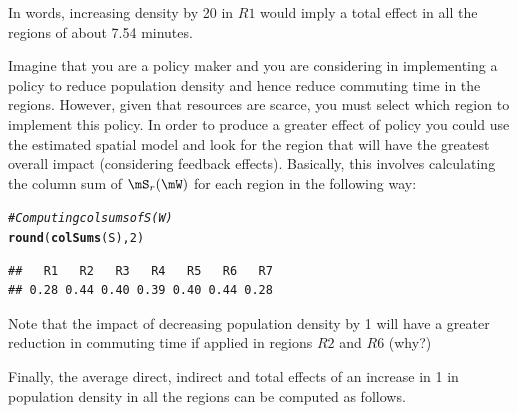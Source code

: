 \documentclass[english,12pt]{book}\usepackage[]{graphicx}\usepackage[]{xcolor}
\makeatletter
\newcommand{\hlnum}[1]{\textcolor[rgb]{0.686,0.059,0.569}{#1}}%
\newcommand{\hlcom}[1]{\textcolor[rgb]{0.678,0.584,0.686}{\textit{#1}}}%
\newcommand{\hldef}[1]{\textcolor[rgb]{0.345,0.345,0.345}{#1}}%
\newcommand{\hlkwd}[1]{\textcolor[rgb]{0.737,0.353,0.396}{\textbf{#1}}}%
\newenvironment{kframe}{%
 \def\at@end@of@kframe{}%
 \ifinner\ifhmode%
  \def\at@end@of@kframe{\end{minipage}}%
  \begin{minipage}{\columnwidth}%
 \fi\fi%
 \def\FrameCommand##1{\hskip\@totalleftmargin \hskip-\fboxsep
 \colorbox{shadecolor}{##1}\hskip-\fboxsep
     \hskip-\linewidth \hskip-\@totalleftmargin \hskip\columnwidth}%
 \MakeFramed {\advance\hsize-\width
   \@totalleftmargin\z@ \linewidth\hsize
   \@setminipage}}%
 {\par\unskip\endMakeFramed%
 \at@end@of@kframe}
\newenvironment{knitrout}{}{} %
\makeatother
\begin{document}
In words, increasing density by 20 in $R1$ would imply a total effect  in all the regions of about 7.54 minutes.

Imagine that you are a policy maker and you are considering in implementing a policy to reduce population density and hence reduce commuting time in the regions. However, given that resources are scarce, you must select which region to implement this policy. In order to produce a greater effect of policy you could use the estimated spatial model and look for the region that will have the greatest overall impact (considering feedback effects). Basically, this involves calculating the column sum of $\mS_r(\mW)$ for each region in the following way: 

\begin{knitrout}
\color{fgcolor}\begin{kframe}
\begin{alltt}
\hlcom{# Computing colsums of S(W)}
\hlkwd{round}\hldef{(}\hlkwd{colSums}\hldef{(S),} \hlnum{2}\hldef{)}
\end{alltt}
\begin{verbatim}
##   R1   R2   R3   R4   R5   R6   R7 
## 0.28 0.44 0.40 0.39 0.40 0.44 0.28
\end{verbatim}
\end{kframe}
\end{knitrout}
   
Note that the impact of decreasing population density by 1 will have a greater reduction in commuting time if applied in regions $R2$ and $R6$ (why?)

Finally, the average direct, indirect and total effects of an increase in 1 in population density in all the regions can be computed as follows. 
\end{document}
